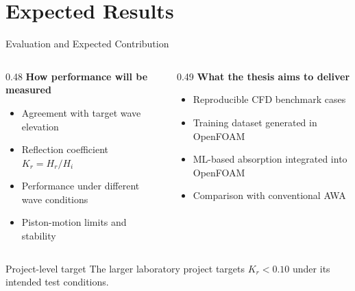 \documentclass[aspectratio=43,11pt]{beamer}
\begin{document}
\section{Expected Results}
\begin{frame}[t]{Evaluation and Expected Contribution}
\begin{columns}[T,onlytextwidth]
\begin{column}{0.48\textwidth}
\textbf{How performance will be measured}
\begin{itemize}\setlength{\itemsep}{2pt}
  \item Agreement with target wave elevation
  \item Reflection coefficient $K_r=H_r/H_i$
  \item Performance under different wave conditions
  \item Piston-motion limits and stability
\end{itemize}
\end{column}
\begin{column}{0.49\textwidth}
\textbf{What the thesis aims to deliver}
\begin{itemize}\setlength{\itemsep}{2pt}
  \item Reproducible CFD benchmark cases
  \item Training dataset generated in OpenFOAM
  \item ML-based absorption integrated into OpenFOAM
  \item Comparison with conventional AWA
\end{itemize}
\end{column}
\end{columns}
\vspace{1mm}
\begin{block}{Project-level target}
  The larger laboratory project targets \textbf{$K_r<0.10$} under its intended test
  conditions.
\end{block}
\vspace{1mm}
\end{frame}

\end{document}
